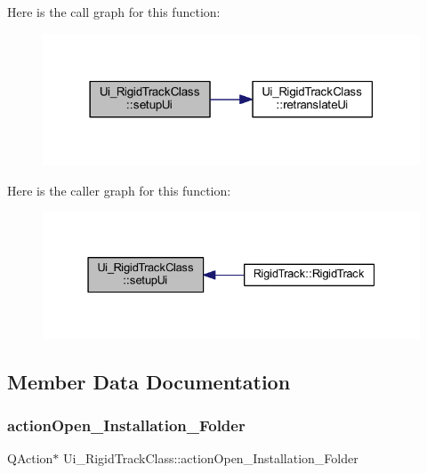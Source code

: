 Here is the call graph for this function\+:\nopagebreak
\begin{figure}[H]
\begin{center}
\leavevmode
\includegraphics[width=318pt]{class_ui___rigid_track_class_a7f78fefc15716049b873bef4d3450e38_cgraph}
\end{center}
\end{figure}
Here is the caller graph for this function\+:\nopagebreak
\begin{figure}[H]
\begin{center}
\leavevmode
\includegraphics[width=331pt]{class_ui___rigid_track_class_a7f78fefc15716049b873bef4d3450e38_icgraph}
\end{center}
\end{figure}


\subsection{Member Data Documentation}
\mbox{\label{class_ui___rigid_track_class_adbf50ad17608dbfe8a688dc8f18d1ec3}} 
\subsubsection{\texorpdfstring{action\+Open\+\_\+\+Installation\+\_\+\+Folder}{actionOpen\_Installation\_Folder}}
{\footnotesize\ttfamily Q\+Action$\ast$ Ui\+\_\+\+Rigid\+Track\+Class\+::action\+Open\+\_\+\+Installation\+\_\+\+Folder}

